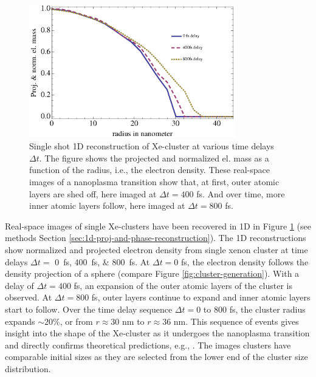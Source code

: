 \begin{figure}
	\centering
		\includegraphics[width=0.80\textwidth]{images/results/Xe-reconstructions.eps}
	\caption[Single-shot 1D reconstruction of $\sim 30$ nm radius Xe-cluster]{Single shot 1D reconstruction of Xe-cluster at various time delays $\Delta t$. The figure shows the projected and normalized el. mass as a function of the radius, i.e., the electron density. These real-space images of a nanoplasma transition show that, at first, outer atomic layers are shed off, here imaged at $\Delta t=400$ fs. And over time, more inner atomic layers follow, here imaged at $\Delta t= 800$ fs.}
	\label{fig:Xe-reconstructions}
\end{figure}
Real-space images of single Xe-clusters have been recovered in 1D in Figure \ref{fig:Xe-reconstructions} (see methods Section \ref{sec:1d-proj-and-phase-reconstruction}). The 1D reconstructions show normalized and projected electron density from single xenon cluster at time delays $\Delta t=$ \SIlist{0;400;800}{\femto\second}. At $\Delta t = 0$ fs, the electron density follows the density projection of a sphere (compare Figure \ref{fig:cluster-generation}). With a delay of $\Delta t = 400$ fs, an expansion of the outer atomic layers of the cluster is observed. At $\Delta t = 800$ fs, outer layers continue to expand and inner atomic layers start to follow. Over the time delay sequence $\Delta t=0$ to $800$ fs, the cluster radius expands $\sim 20\%$, or from $r\approx 30$ nm to $r\approx 36$ nm. This sequence of events gives insight into the shape of the Xe-cluster as it undergoes the nanoplasma transition and directly confirms theoretical predictions, e.g., \citep{Hau-Riege-2004-PRE}. The images clusters have comparable initial sizes as they are selected from the lower end of the cluster size distribution.\\[1\baselineskip]
